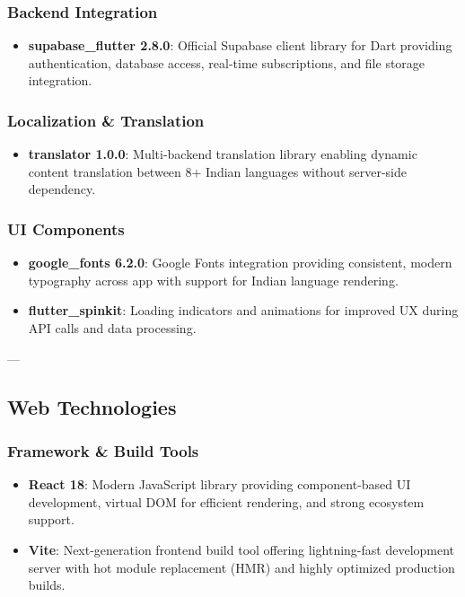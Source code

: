 \subsubsection{Backend Integration}
\begin{itemize}
    \item \textbf{supabase\_flutter 2.8.0}: Official Supabase client library for Dart providing authentication, database access, real-time subscriptions, and file storage integration.
\end{itemize}

\subsubsection{Localization \& Translation}
\begin{itemize}
    \item \textbf{translator 1.0.0}: Multi-backend translation library enabling dynamic content translation between 8+ Indian languages without server-side dependency.
\end{itemize}

\subsubsection{UI Components}
\begin{itemize}
    \item \textbf{google\_fonts 6.2.0}: Google Fonts integration providing consistent, modern typography across app with support for Indian language rendering.
    \item \textbf{flutter\_spinkit}: Loading indicators and animations for improved UX during API calls and data processing.
\end{itemize}

---

\subsection{Web Technologies}

\subsubsection{Framework \& Build Tools}
\begin{itemize}
    \item \textbf{React 18}: Modern JavaScript library providing component-based UI development, virtual DOM for efficient rendering, and strong ecosystem support.
    \item \textbf{Vite}: Next-generation frontend build tool offering lightning-fast development server with hot module replacement (HMR) and highly optimized production builds.
\end{itemize}

